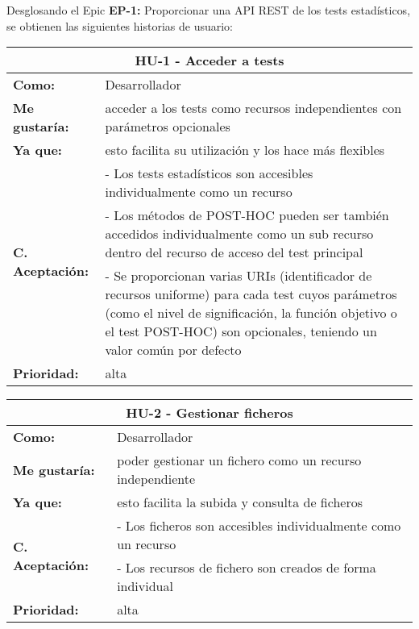 Desglosando el Epic \textbf{EP-1:} Proporcionar una API REST de los tests estadísticos, se obtienen las siguientes historias de usuario:

\begin{table}[H]
	\begin{tabular}{| p{3cm}| p{11cm} |}
		\hline
		\multicolumn{2}{|c|}{\textbf{HU-1} - Acceder a tests} \\ \hline
		\textbf{Como:} & Desarrollador \\ \hline
		\textbf{Me gustaría:} & acceder a los tests como recursos independientes con parámetros opcionales \\ \hline
		\textbf{Ya que:} & esto facilita su utilización y los hace más flexibles \\ \hline
		\multirow{3}{11cm}{\textbf{C. Aceptación:}} & - Los tests estadísticos son accesibles individualmente como un recurso \\
		& - Los métodos de POST-HOC pueden ser también accedidos individualmente como un sub recurso dentro del recurso de acceso del test principal \\
		& - Se proporcionan varias URIs (identificador de recursos uniforme) para cada test cuyos parámetros (como el nivel de significación, la función objetivo o el test POST-HOC) son opcionales, teniendo un valor común por defecto \\ \hline
		\textbf{\textbf{Prioridad:}} & alta \\ \hline
	\end{tabular}
\end{table}


\begin{table}[H]
	\begin{tabular}{| p{3cm}| p{11cm} |}
		\hline
		\multicolumn{2}{|c|}{\textbf{HU-2} - Gestionar ficheros} \\ \hline
		\textbf{Como:} & Desarrollador \\ \hline
		\textbf{Me gustaría:} & poder gestionar un fichero como un recurso independiente \\ \hline
		\textbf{Ya que:} & esto facilita la subida y consulta de ficheros \\ \hline
		\multirow{2}{11cm}{\textbf{C. Aceptación:}} & - Los ficheros son accesibles individualmente como un recurso \\
		& - Los recursos de fichero son creados de forma individual \\ \hline 
		\textbf{\textbf{Prioridad:}} & alta \\ \hline
	\end{tabular}
\end{table}
	
